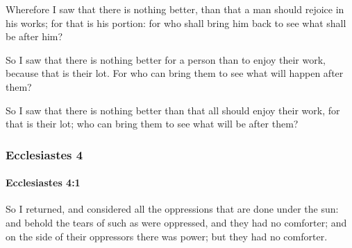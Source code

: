 			\begin{versebox}
					\item[BHS] 
					\item[LXX] 
					\item[ASV] Wherefore I saw that there is nothing better, than that a man should rejoice in his works; for that is his portion: for who shall bring him back to see what shall be after him?
					\item[NIV] So I saw that there is nothing better for a person than to enjoy their work, because that is their lot. For who can bring them to see what will happen after them?
					\item[NRSV] So I saw that there is nothing better than that all should enjoy their work, for that is their lot; who can bring them to see what will be after them?
			\end{versebox}
	\subsubsection{Ecclesiastes 4} %
		\label{ECCLESIASTES-4}

		\paragraph{Ecclesiastes 4:1} %
			\label{ECCLESIASTES-4-1}

			So I returned, and considered all the oppressions that are done under the sun: and behold the tears of such as were oppressed, and they had no comforter; and on the side of their oppressors there was power; but they had no comforter.

